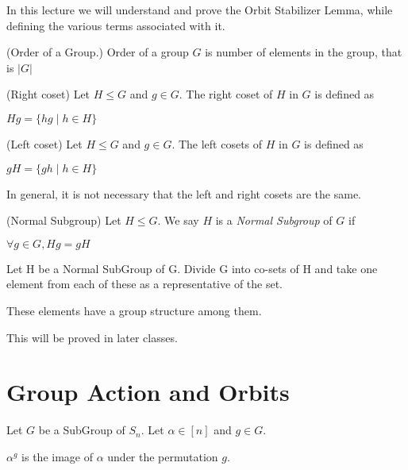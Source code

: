 In this lecture we will understand and prove the Orbit Stabilizer Lemma, while defining the various terms associated with it.


\begin{definition}(Order of a Group.) Order of a group $G$ is number of elements in the group, that is $|G|$ \end{definition}

\begin{definition}(Right coset) Let $H \le G$ and $g \in G$. The right coset of $H$ in $G$ is defined as 
\begin{center}
$Hg = \{hg \mid h \in H\}$
\end{center}
 \end{definition}

\begin{definition}(Left coset) Let $H \le G$ and $g \in G$. The left cosets of $H$ in $G$ is defined as 
\begin{center}
$gH = \{gh \mid h \in H\}$
\end{center}
\end{definition}

\begin{note}
In general, it is not necessary that the left and right cosets are the same.
\end{note}

\begin{definition}(Normal Subgroup)
Let $H \le G$. We say $H$ is a {\em Normal Subgroup} of $G$ if
\begin{center}
$\forall g \in G, Hg= gH$
\end{center}
\end{definition}

Let H be a Normal SubGroup of G. Divide G into co-sets of H and take one element from each of these as a representative of the set.
\begin{claim} These elements have a group structure among them. \end{claim}
This will be proved in later classes.

\section{Group Action and Orbits}
Let $G$ be a SubGroup of $S_n$. Let $\alpha \in [n]$ and $g \in G$.

\begin{notation} $\alpha^g$ is the image of $\alpha$ under the permutation $g$. 
\end{notation}

